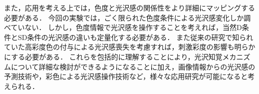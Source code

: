         また，応用を考える上では，色度と光沢感の関係性をより詳細にマッピングする必要がある．
        今回の実験では，ごく限られた色度条件による光沢感変化しか調べていない．
        しかし，色度情報で光沢感を操作することを考えれば，当然D条件とSD条件の光沢感の違いも定量化する必要がある．
        また従来の研究で知られていた高彩度色の付与による光沢感喪失\cite{Nishida}を考慮すれば，刺激彩度の影響も明らかにする必要がある．
        これらを包括的に理解することにより，光沢知覚メカニズムについて詳細な検討ができるようになることに加え，画像情報からの光沢感の予測技術や，彩色による光沢感操作技術など，様々な応用研究が可能になると考えられる．


    \newpage